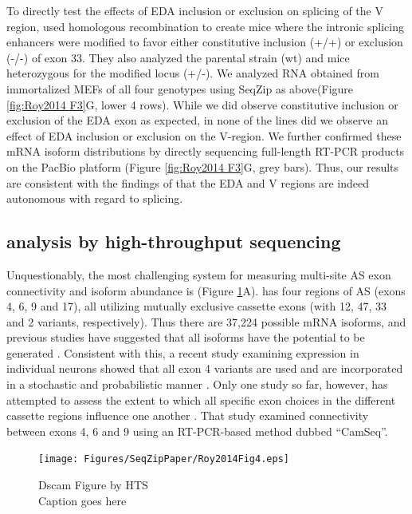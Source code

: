 {		To directly test the effects of EDA inclusion or exclusion on splicing of the V region, \citet{Chauhan2004} used homologous recombination to create mice where the intronic splicing enhancers were modified to favor either constitutive inclusion (+/+) or exclusion (-/-) of exon 33. They also analyzed the parental strain (wt) and mice heterozygous for the modified locus (+/-). We analyzed RNA obtained from immortalized MEFs of all four genotypes using SeqZip as above(Figure \ref{fig:Roy2014 F3}G, lower 4 rows). While we did observe constitutive inclusion or exclusion of the EDA exon as expected, in none of the lines did we observe an effect of EDA inclusion or exclusion on the V-region. We further confirmed these mRNA isoform distributions by directly sequencing full-length RT-PCR products on the PacBio platform (Figure \ref{fig:Roy2014 F3}G, grey bars). Thus, our results are consistent with the findings of \citet{Chauhan2004} that the EDA and V regions are indeed autonomous with regard to splicing.

	\subsection{\dscam{} analysis by high-throughput sequencing}

		Unquestionably, the most challenging system for measuring multi-site AS exon connectivity and isoform abundance is \dscam{} (Figure \ref{fig:Roy2014 F4}A). \dscam{} has four regions of AS (exons 4, 6, 9 and 17), all utilizing mutually exclusive cassette exons (with 12, 47, 33 and 2 variants, respectively). Thus there are 37,224 possible \dscam{} mRNA isoforms, and previous studies have suggested that all isoforms have the potential to be generated \citep{Neves2004,Zhan2004,Sun2013}. Consistent with this, a recent study examining \dscam{} expression in individual neurons showed that all exon 4 variants are used and are incorporated in a stochastic and probabilistic manner \citep{Miura2013b}. Only one study so far, however, has attempted to assess the extent to which all specific exon choices in the different cassette regions influence one another \citep{Sun2013}. That study examined connectivity between exons 4, 6 and 9 using an RT-PCR-based method dubbed ``CamSeq''.

		\begin{figure}[htbp] %
			\centering 
			\texttt{[image: Figures/SeqZipPaper/Roy2014Fig4.eps]}
			\caption[Dscam Figure by HTS]
			{
				Dscam Figure by HTS\\
				Caption goes here
				}
			\label{fig:Roy2014 F4}
			\end{figure}

}
